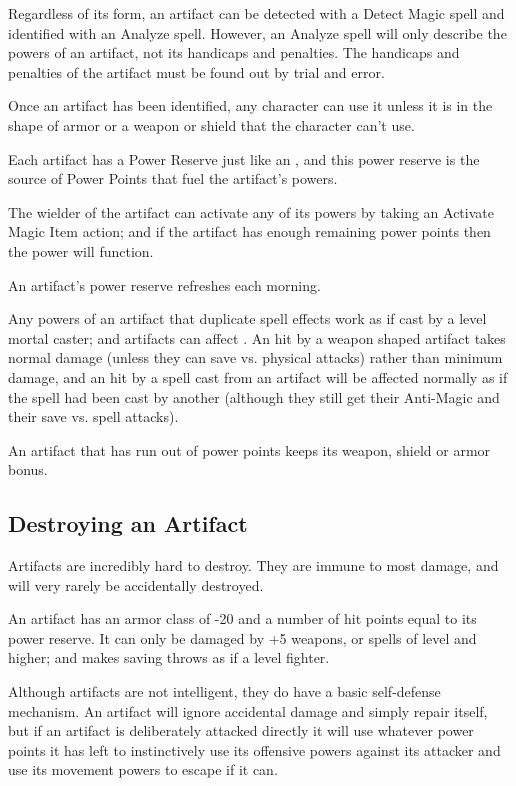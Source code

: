 \begin{multicols*}{2}
Regardless of its form, an artifact can be detected with a Detect Magic spell and identified with an Analyze spell. However, an Analyze spell will only describe the powers of an artifact, not its handicaps and penalties. The handicaps and penalties of the artifact must be found out by trial and error.

Once an artifact has been identified, any character can use it unless it is in the shape of armor or a weapon or shield that the character can’t use.

Each artifact has a Power Reserve just like an , and this power reserve is the source of Power Points that fuel the artifact’s powers.

The wielder of the artifact can activate any of its powers by taking an Activate Magic Item action; and if the artifact has enough remaining power points then the power will function.

An artifact’s power reserve refreshes each morning.

Any powers of an artifact that duplicate spell effects work as if cast by a  level mortal caster; and artifacts can affect . An  hit by a weapon shaped artifact takes normal damage (unless they can save vs. physical attacks) rather than minimum damage, and an  hit by a spell cast from an artifact will be affected normally as if the spell had been cast by another  (although they still get their Anti-Magic and their save vs. spell attacks).

An artifact that has run out of power points keeps its weapon, shield or armor bonus.

\subsection{Destroying an Artifact}
Artifacts are incredibly hard to destroy. They are immune to most damage, and will very rarely be accidentally destroyed.

An artifact has an armor class of -20 and a number of hit points equal to its power reserve. It can only be damaged by +5 weapons, or spells of  level and higher; and makes saving throws as if a  level fighter.

Although artifacts are not intelligent, they do have a basic self-defense mechanism. An artifact will ignore accidental damage and simply repair itself, but if an artifact is deliberately attacked directly it will use whatever power points it has left to instinctively use its offensive powers against its attacker and use its movement powers to escape if it can.


\end{multicols*}
